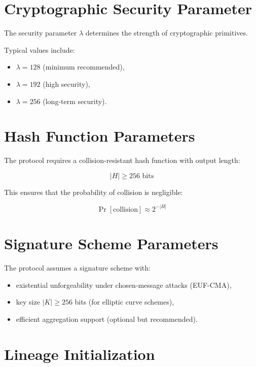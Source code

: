 \section{Cryptographic Security Parameter}

The security parameter $\lambda$ determines the strength of cryptographic primitives.

Typical values include:

\begin{itemize}
\item $\lambda = 128$ (minimum recommended),
\item $\lambda = 192$ (high security),
\item $\lambda = 256$ (long-term security).
\end{itemize}

\section{Hash Function Parameters}

The protocol requires a collision-resistant hash function with output length:

\begin{equation}
|H| \geq 256 \text{ bits}
\end{equation}

This ensures that the probability of collision is negligible:

\begin{equation}
\Pr[\text{collision}] \approx 2^{-|H|}
\end{equation}

\section{Signature Scheme Parameters}

The protocol assumes a signature scheme with:

\begin{itemize}
\item existential unforgeability under chosen-message attacks (EUF-CMA),
\item key size $|K| \geq 256$ bits (for elliptic curve schemes),
\item efficient aggregation support (optional but recommended).
\end{itemize}

\section{Lineage Initialization}

